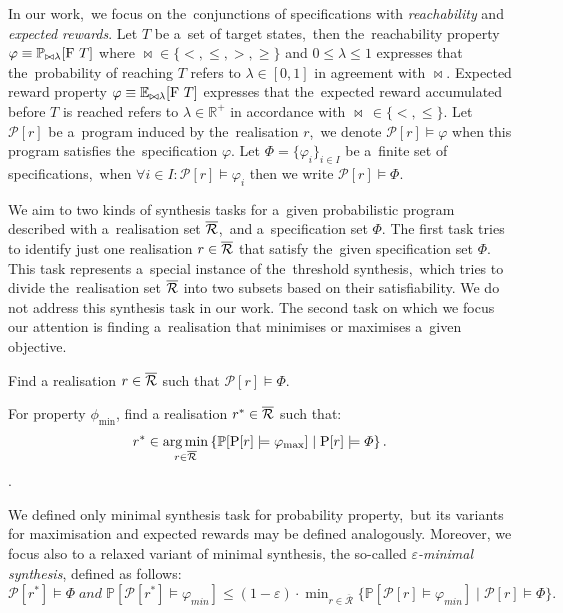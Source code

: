 \begin{definition}[Specification]
In our work,~we focus on the~conjunctions of specifications with \textit{reachability} and \textit{expected rewards}.
Let $T$ be a~set of target states,~then the~reachability property $\varphi \equiv \mathbb{P}_{\bowtie \lambda}[\mathrm{F}\ T]$ where $\bowtie \in \{<, \leq, >, \geq\}$ and $0 \leq \lambda \leq 1$ expresses that the~probability of reaching $T$ refers to $\lambda \in [0,1]$ in agreement with $\bowtie$.
Expected reward property $\varphi \equiv \mathbb{E}_{\bowtie \lambda}[\mathrm{F}\ T]$ expresses that the~expected reward accumulated before $T$ is reached refers to $\lambda \in \mathbb{R}^+$ in accordance with $\bowtie \, \in \{<, \leq \}$.
Let $\mathcal{P}[r]$ be a~program induced by the~realisation $r$,~we denote $\mathcal{P}[r] \models \varphi$ when this program satisfies the~specification $\varphi$.
Let $\varPhi = \{ \varphi_i \}_{i \in I}$ be a~finite set of specifications,~when $\forall i \in I: \mathcal{P}[r] \models \varphi_i$ then we write $\mathcal{P}[r] \models \varPhi$.
\end{definition}

We aim to two kinds of synthesis tasks for a~given probabilistic program described with a~realisation set $\overline{\mathcal{R}}$,~and a~specification set $\varPhi$.
The first task tries to identify just one realisation $r \in \overline{\mathcal{R}}$ that satisfy the~given specification set $\varPhi$.
This task represents a~special instance of the~threshold synthesis,~which tries to divide the~realisation set $\overline{\mathcal{R}}$ into two subsets based on their satisfiability.
We do not address this synthesis task in our work.
The second task on which we focus our attention is finding a~realisation that minimises or maximises a~given objective.

\begin{definition}[Feasibility]
Find a realisation $r \in \overline{\mathcal{R}}$ such that $\mathcal{P}[r] \models \varPhi$. 
\end{definition}

\begin{definition}[Minimality] \label{def:minimality}
For property $\phi_{\min}$, find a realisation $r^* \in \overline{\mathcal{R}}$ such that:
$$r^* \in \operatorname*{arg\,min}_{r \in \overline{\mathcal{R}}} \left \{ \mathbb{P}[\mathrm{P}[r] \models \varphi_{\max}] \mid \mathrm{P}[r] \models \varPhi \right \}.$$.
\end{definition}

We defined only minimal synthesis task for probability property,~but its variants for maximisation and expected rewards may be defined analogously.
Moreover, we focus also to a relaxed variant of minimal synthesis, the so-called \textit{$\varepsilon$-minimal synthesis}, defined as follows: $\mathcal{P}[r^*] \models \varPhi \; and \; 
\mathbb{P}[\mathcal{P}[r^*] \models \varphi_{min}] \leq (1 - \varepsilon) \cdot \min_{r \in \mathcal{\overline{R}}} \{ \mathbb{P}[\mathcal{P}[r] \models \varphi_{min}] \; \lvert \; \mathcal{P}[r] \models \varPhi \}.$

